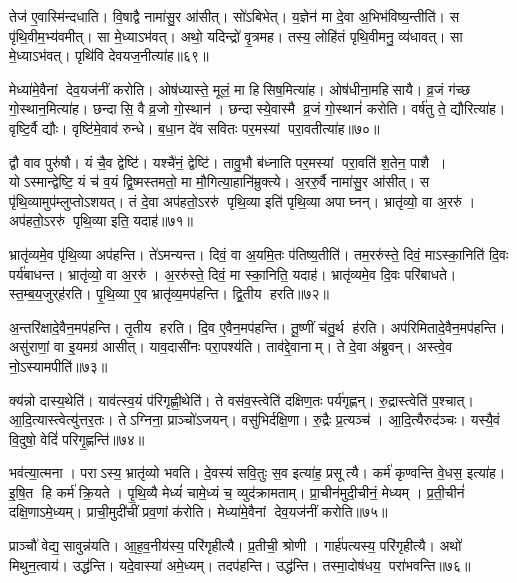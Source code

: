 तेज॑ ए॒वास्मि॑न्दधाति। वि॒षाद्वै नामा॑सु॒र आ॑सीत्। सो॑ऽबिभेत्। य॒ज्ञेन॑ मा दे॒वा अ॒भिभ॑विष्य॒न्तीति॑। स पृ॑थि॒वीम॒भ्य॑वमीत्। सा मे॒ध्याऽभ॑वत्। अथो॒ यदिन्द्रो॑ वृ॒त्रमह\sn{}। तस्य॒ लोहि॑तं पृथि॒वीमनु॒ व्य॑धावत्। सा मे॒ध्याऽभ॑वत्। पृथि॑वि देवयज॒नीत्या॑ह॥६९॥

मेध्या॑मे॒वैनां देव॒यज॑नीं करोति। ओष॑ध्यास्ते॒ मूलं॒ मा हिसिष॒मित्या॑ह। ओष॑धीना॒महिसायै। व्र॒जं ग॑च्छ गो॒स्थान॒मित्या॑ह। छन्दासि॒ वै व्र॒जो गो॒स्थान॑। छन्दास्ये॒वास्मै व्र॒जं गो॒स्थानं॑ करोति। वर्\mbox{}ष॑तु ते॒ द्यौरित्या॑ह। वृष्टि॒र्वै द्यौः। वृष्टि॑मे॒वाव॑ रुन्धे। ब॒धा॒न दे॑व सवितः पर॒मस्यां परा॒वतीत्या॑ह॥७०॥

द्वौ वाव पुरु॑षौ। यं चै॒व द्वेष्टि॑। यश्चै॑नं॒ द्वेष्टि॑। तावु॒भौ ब॑ध्नाति पर॒मस्यां परा॒वति॑ श॒तेन॒ पाशै। योऽस्मान्द्वेष्टि॒ यं च॑ व॒यं द्वि॒ष्मस्तमतो॒ मा मौ॒गित्या॒हानि॑म्रुक्त्ये। अ॒ररु॒र्वै नामा॑सु॒र आ॑सीत्। स पृ॑थि॒व्यामुप॑म्लुप्तोऽशयत्। तं दे॒वा अप॑हतो॒ऽररु॑ पृथि॒व्या इति॑ पृथि॒व्या अपाघ्नन्। भ्रातृ॑व्यो॒ वा अ॒ररु॑। अप॑हतो॒ऽररु॑ पृथि॒व्या इति॒ यदाह॑॥७१॥

भ्रातृ॑व्यमे॒व पृ॑थि॒व्या अप॑हन्ति। ते॑ऽमन्यन्त। दिवं॒ वा अ॒यमि॒तः प॑तिष्य॒तीति॑। तम॒ररु॑स्ते॒ दिवं॒ माऽस्का॒निति॑ दि॒वः पर्य॑बाधन्त। भ्रातृ॑व्यो॒ वा अ॒ररु॑। अ॒ररु॑स्ते॒ दिवं॒ मा स्का॒निति॒ यदाह॑। भ्रातृ॑व्यमे॒व दि॒वः परि॑बाधते। स्त॒म्ब॒य॒जुर्‌ह॑रति। पृ॒थि॒व्या ए॒व भ्रातृ॑व्य॒मप॑हन्ति। द्वि॒तीय हरति॥७२॥

अ॒न्तरि॑क्षादे॒वैन॒मप॑हन्ति। तृ॒तीय हरति। दि॒व ए॒वैन॒मप॑हन्ति। तू॒ष्णीं च॑तु॒र्थ ह॑रति। अप॑रिमितादे॒वैन॒मप॑हन्ति। असु॑राणां॒ वा इ॒यमग्र॑ आसीत्। याव॒दासी॑नः परा॒पश्य॑ति। ताव॑द्दे॒वानाम्। ते दे॒वा अ॑ब्रुवन्। अस्त्वे॒व नो॒ऽस्यामपीति॑॥७३॥

क्य॑न्नो दास्य॒थेति॑। याव॑त्स्व॒यं प॑रिगृह्णी॒थेति॑। ते वस॑व॒स्त्वेति॑ दक्षिण॒तः पर्य॑गृह्णन्। रु॒द्रास्त्वेति॑ प॒श्चात्। आ॒दि॒त्यास्त्वेत्यु॑त्तर॒तः। तेऽग्निना॒ प्राञ्चो॑ऽजयन्। वसु॑भिर्दक्षि॒णा। रु॒द्रैः प्र॒त्यञ्च॑। आ॒दि॒त्यैरुद॑ञ्चः। यस्यै॒वं वि॒दुषो॒ वेदिं॑ परिगृ॒ह्णन्ति॑॥७४॥

भव॑त्या॒त्मना। पराऽस्य॒ भ्रातृ॑व्यो भवति। दे॒वस्य॑ सवि॒तुः स॒व इत्या॑ह॒ प्रसूत्यै। कर्म॑ कृण्वन्ति वे॒धस॒ इत्या॑ह। इ॒षि॒त हि कर्म॑ क्रि॒यते। पृ॒थि॒व्यै मेध्यं॑ चामे॒ध्यं च॒ व्युद॑क्रामताम्। प्रा॒चीन॑मुदी॒चीनं॒ मेध्यम्। प्र॒ती॒चीनं॑ दक्षि॒णाऽमे॒ध्यम्। प्राची॒मुदी॑चीं प्रव॒णां क॑रोति। मेध्या॑मे॒वैनां देव॒यज॑नीं करोति॥७५॥

प्राञ्चौ॑ वेद्य॒सावुन्न॑यति। आ॒ह॒व॒नीय॑स्य॒ परि॑गृहीत्यै। प्र॒तीची॒ श्रोणी। गार्ह॑पत्यस्य॒ परि॑गृहीत्यै। अथो॑ मिथुन॒त्वाय॑। उद्ध॑न्ति। यदे॒वास्या॑ अमे॒ध्यम्। तदप॑हन्ति। उद्ध॑न्ति। तस्मा॒दोष॑धय॒ परा॑भवन्ति॥७६॥

